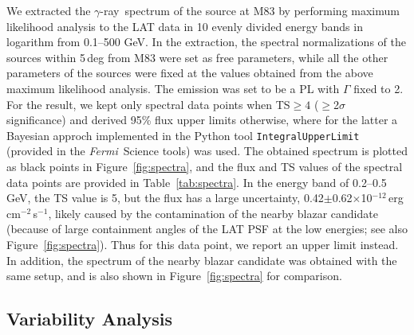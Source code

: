 \documentclass[twocolumn]{aastex631}
\newcommand{\fermi}{\textit{Fermi}}
\newcommand{\gr}{$\gamma$-ray}
\begin{document}
We extracted the \gr\ spectrum of the source at M83 by performing maximum 
likelihood analysis to the LAT data in 10 evenly 
divided energy bands in logarithm from 0.1--500 GeV. 
In the extraction, the spectral normalizations of the sources within 5\,deg 
from M83 were set as free parameters, while all the other parameters 
of the sources were fixed at the values obtained from the above maximum 
likelihood analysis. The emission was set to be a PL with $\Gamma$ fixed to 2.
For the result, we kept only spectral data points when 
TS$\geq 4$ ($\geq$2$\sigma$ significance) and derived 95\% flux upper 
limits otherwise, where for the latter a Bayesian approch implemented
in the Python tool {\tt IntegralUpperLimit} (provided in the \fermi\ Science
tools) was used. 
The obtained spectrum is plotted as black points in Figure~\ref{fig:spectra}, 
and the flux and TS values of the spectral data points are provided in 
Table~\ref{tab:spectra}. In the energy band of 0.2--0.5 GeV, the TS value 
is 5, but the flux has a large uncertainty, 
0.42$\pm$0.62$\times$10$^{-12}$\,erg\,cm$^{-2}$\,s$^{-1}$, likely caused by
the contamination of
the nearby blazar candidate (because of large containment angles of the LAT
PSF at the low energies; see also Figure~\ref{fig:spectra}). Thus for
this data point, we report
an upper limit instead. In addition, the spectrum of the nearby blazar candidate
was obtained with the same setup, and is also shown in Figure~\ref{fig:spectra}
for comparison.

\subsection{Variability Analysis}
\end{document}
